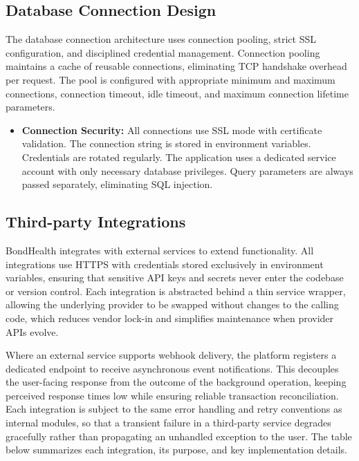 \subsection{Database Connection Design}

\justifying
\noindent The database connection architecture uses connection pooling, strict SSL configuration, and disciplined credential management. Connection pooling maintains a cache of reusable connections, eliminating TCP handshake overhead per request. The pool is configured with appropriate minimum and maximum connections, connection timeout, idle timeout, and maximum connection lifetime parameters.

\begin{itemize}
    \item \textbf{Connection Security:} All connections use SSL mode with certificate validation. The connection string is stored in environment variables. Credentials are rotated regularly. The application uses a dedicated service account with only necessary database privileges. Query parameters are always passed separately, eliminating SQL injection.
\end{itemize}

\subsection{Third-party Integrations}

\justifying
\noindent BondHealth integrates with external services to extend functionality. All integrations use HTTPS with credentials stored exclusively in environment variables, ensuring that sensitive API keys and secrets never enter the codebase or version control. Each integration is abstracted behind a thin service wrapper, allowing the underlying provider to be swapped without changes to the calling code, which reduces vendor lock-in and simplifies maintenance when provider APIs evolve.

\justifying
\noindent Where an external service supports webhook delivery, the platform registers a dedicated endpoint to receive asynchronous event notifications. This decouples the user-facing response from the outcome of the background operation, keeping perceived response times low while ensuring reliable transaction reconciliation. Each integration is subject to the same error handling and retry conventions as internal modules, so that a transient failure in a third-party service degrades gracefully rather than propagating an unhandled exception to the user. The table below summarizes each integration, its purpose, and key implementation details.

